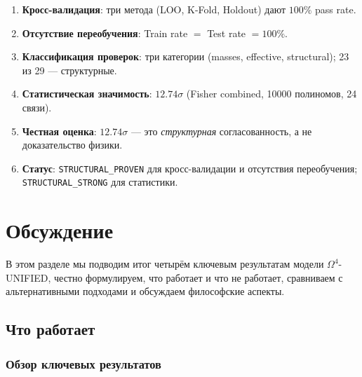 \documentclass[11pt,a4paper]{article}
\newcommand{\Om}{\ensuremath{\Omega^4}}
\theoremstyle{definition}
\begin{document}
\begin{enumerate}
    \item \textbf{Кросс-валидация}: три метода (LOO, K-Fold,
          Holdout) дают $100\%$ pass rate.
    \item \textbf{Отсутствие переобучения}: Train rate
          $=$ Test rate $= 100\%$.
    \item \textbf{Классификация проверок}: три категории
          (masses, effective, structural); 23 из 29 ---
          структурные.
    \item \textbf{Статистическая значимость}:
          $12.74\sigma$ (Fisher combined, 10000 полиномов,
          24 связи).
    \item \textbf{Честная оценка}: $12.74\sigma$ — это
          \emph{структурная} согласованность, а не
          доказательство физики.
    \item \textbf{Статус}: \texttt{STRUCTURAL\_PROVEN} для
          кросс-валидации и отсутствия переобучения;
          \texttt{STRUCTURAL\_STRONG} для статистики.
\end{enumerate}

\section{Обсуждение}
\label{sec:discussion}

В этом разделе мы подводим итог четырём ключевым результатам
модели $\Om$-UNIFIED, честно формулируем, что работает и что
не работает, сравниваем с альтернативными подходами и обсуждаем
философские аспекты.

\subsection{Что работает}
\label{subsec:disc-works}

\subsubsection{Обзор ключевых результатов}
\end{document}
